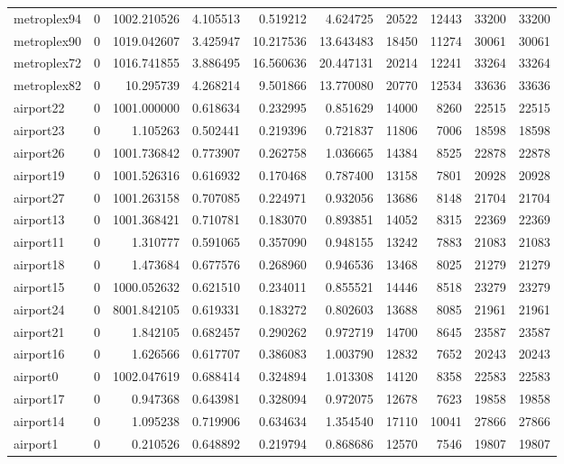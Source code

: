 \begin{longtable}{|l|r|r|r|r|r|r|r|r|r|}
metroplex94 & 0 & 1002.210526 & 4.105513 & 0.519212 & 4.624725 & 20522 & 12443 & 33200 & 33200 \\
metroplex90 & 0 & 1019.042607 & 3.425947 & 10.217536 & 13.643483 & 18450 & 11274 & 30061 & 30061 \\
metroplex72 & 0 & 1016.741855 & 3.886495 & 16.560636 & 20.447131 & 20214 & 12241 & 33264 & 33264 \\
metroplex82 & 0 & 10.295739 & 4.268214 & 9.501866 & 13.770080 & 20770 & 12534 & 33636 & 33636 \\
airport22 & 0 & 1001.000000 & 0.618634 & 0.232995 & 0.851629 & 14000 & 8260 & 22515 & 22515 \\
airport23 & 0 & 1.105263 & 0.502441 & 0.219396 & 0.721837 & 11806 & 7006 & 18598 & 18598 \\
airport26 & 0 & 1001.736842 & 0.773907 & 0.262758 & 1.036665 & 14384 & 8525 & 22878 & 22878 \\
airport19 & 0 & 1001.526316 & 0.616932 & 0.170468 & 0.787400 & 13158 & 7801 & 20928 & 20928 \\
airport27 & 0 & 1001.263158 & 0.707085 & 0.224971 & 0.932056 & 13686 & 8148 & 21704 & 21704 \\
airport13 & 0 & 1001.368421 & 0.710781 & 0.183070 & 0.893851 & 14052 & 8315 & 22369 & 22369 \\
airport11 & 0 & 1.310777 & 0.591065 & 0.357090 & 0.948155 & 13242 & 7883 & 21083 & 21083 \\
airport18 & 0 & 1.473684 & 0.677576 & 0.268960 & 0.946536 & 13468 & 8025 & 21279 & 21279 \\
airport15 & 0 & 1000.052632 & 0.621510 & 0.234011 & 0.855521 & 14446 & 8518 & 23279 & 23279 \\
airport24 & 0 & 8001.842105 & 0.619331 & 0.183272 & 0.802603 & 13688 & 8085 & 21961 & 21961 \\
airport21 & 0 & 1.842105 & 0.682457 & 0.290262 & 0.972719 & 14700 & 8645 & 23587 & 23587 \\
airport16 & 0 & 1.626566 & 0.617707 & 0.386083 & 1.003790 & 12832 & 7652 & 20243 & 20243 \\
airport0 & 0 & 1002.047619 & 0.688414 & 0.324894 & 1.013308 & 14120 & 8358 & 22583 & 22583 \\
airport17 & 0 & 0.947368 & 0.643981 & 0.328094 & 0.972075 & 12678 & 7623 & 19858 & 19858 \\
airport14 & 0 & 1.095238 & 0.719906 & 0.634634 & 1.354540 & 17110 & 10041 & 27866 & 27866 \\
airport1 & 0 & 0.210526 & 0.648892 & 0.219794 & 0.868686 & 12570 & 7546 & 19807 & 19807 \\

\end{longtable}
